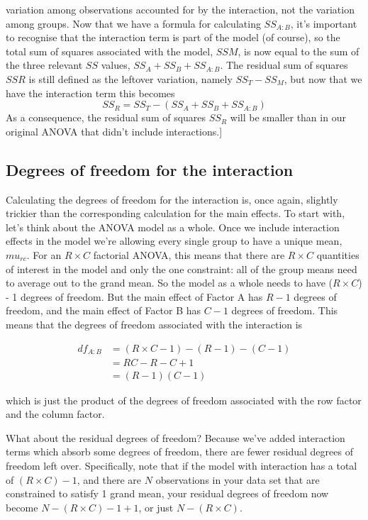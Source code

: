 \documentclass[
  a4paper,
]{book}
\begin{document}
{  variation among observations accounted for by the interaction, not the
  variation among groups. Now that we have a formula for calculating
  \(SS_{A:B}\), it's important to recognise that the interaction term is
  part of the model (of course), so the total sum of squares associated
  with the model, \(SSM\), is now equal to the sum of the three relevant
  \(SS\) values, \(SS_A + SS_B + SS_{A:B}\). The residual sum of squares
  \(SSR\) is still defined as the leftover variation, namely
  \(SS_T - SS_M\), but now that we have the interaction term this
  becomes \[SS_R=SS_T-(SS_A+SS_B+SS_{A:B})\] As a consequence, the
  residual sum of squares \(SS_R\) will be smaller than in our original
  ANOVA that didn't include interactions.}{]}

\hypertarget{degrees-of-freedom-for-the-interaction}{%
\subsection{Degrees of freedom for the
interaction}\label{degrees-of-freedom-for-the-interaction}}

Calculating the degrees of freedom for the interaction is, once again,
slightly trickier than the corresponding calculation for the main
effects. To start with, let's think about the ANOVA model as a whole.
Once we include interaction effects in the model we're allowing every
single group to have a unique mean, \(mu_{rc}\). For an \(R \times C\)
factorial ANOVA, this means that there are \(R \times C\) quantities of
interest in the model and only the one constraint: all of the group
means need to average out to the grand mean. So the model as a whole
needs to have (\(R \times C\)) - 1 degrees of freedom. But the main
effect of Factor A has \(R - 1\) degrees of freedom, and the main effect
of Factor B has \(C - 1\) degrees of freedom. This means that the
degrees of freedom associated with the interaction is

\[
\begin{aligned}
df_{A:B} & = (R \times C - 1) - (R - 1) - (C - 1) \\
& = RC - R - C + 1 \\
& = (R-1)(C-1)
\end{aligned}
\]

which is just the product of the degrees of freedom associated with the
row factor and the column factor.

What about the residual degrees of freedom? Because we've added
interaction terms which absorb some degrees of freedom, there are fewer
residual degrees of freedom left over. Specifically, note that if the
model with interaction has a total of \((R \times C) - 1\), and there
are \(N\) observations in your data set that are constrained to satisfy
1 grand mean, your residual degrees of freedom now become
\(N - (R \times C) - 1 + 1\), or just \(N - (R \times C)\).
\end{document}
